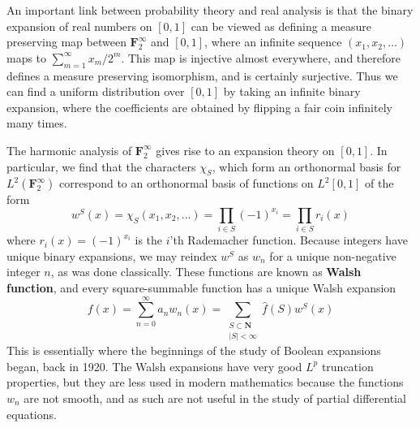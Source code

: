An important link between probability theory and real analysis is that the binary expansion of real numbers on $[0,1]$ can be viewed as defining a measure preserving map between $\mathbf{F}_2^\infty$ and $[0,1]$, where an infinite sequence $(x_1, x_2, \dots)$ maps to $\sum_{m = 1}^\infty x_m/2^m$. This map is injective almost everywhere, and therefore defines a measure preserving isomorphism, and is certainly surjective. Thus we can find a uniform distribution over $[0,1]$ by taking an infinite binary expansion, where the coefficients are obtained by flipping a fair coin infinitely many times.

The harmonic analysis of $\mathbf{F}_2^\infty$ gives rise to an expansion theory on $[0,1]$. In particular, we find that the characters $\chi_S$, which form an orthonormal basis for $L^2(\mathbf{F}_2^\infty)$ correspond to an orthonormal basis of functions on $L^2[0,1]$ of the form
%
\[ w^S(x) = \chi_S(x_1, x_2, \dots) = \prod_{i \in S} (-1)^{x_i} = \prod_{i \in S} r_i(x) \]
%
where $r_i(x) = (-1)^{x_i}$ is the $i$'th Rademacher function. Because integers have unique binary expansions, we may reindex $w^S$ as $w_n$ for a unique non-negative integer $n$, as was done classically. These functions are known as {\bf Walsh function}, and every square-summable function has a unique Walsh expansion
%
\[ f(x) = \sum_{n = 0}^\infty a_n w_n(x) = \sum_{\substack{S \subset \mathbf{N}\\ |S| < \infty}} \widehat{f}(S) w^S(x) \]
%
This is essentially where the beginnings of the study of Boolean expansions began, back in 1920. The Walsh expansions have very good $L^p$ truncation properties, but they are less used in modern mathematics because the functions $w_n$ are not smooth, and as such are not useful in the study of partial differential equations.

